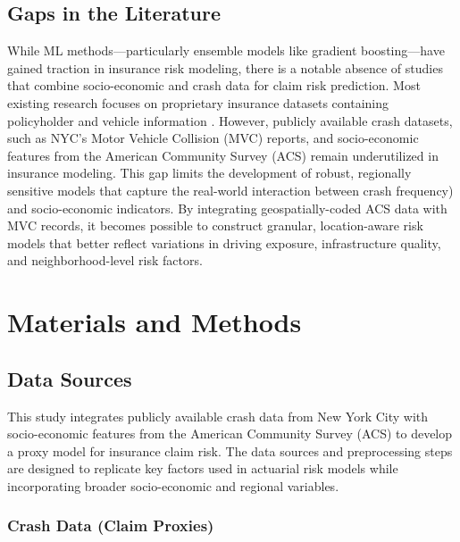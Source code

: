 \documentclass[
  number,
  review,
  3p]{elsarticle}
\begin{document}
\subsection{\texorpdfstring{\textbf{Gaps in the
Literature}}{Gaps in the Literature}}\label{gaps-in-the-literature}

While ML methods---particularly ensemble models like gradient
boosting---have gained traction in insurance risk modeling, there is a
notable absence of studies that combine socio-economic and crash data
for claim risk prediction. Most existing research focuses on proprietary
insurance datasets containing policyholder and vehicle information
\citep{clemente, henckaerts, jonkheijm}. However, publicly available
crash datasets, such as NYC's Motor Vehicle Collision (MVC) reports, and
socio-economic features from the American Community Survey (ACS) remain
underutilized in insurance modeling. This gap limits the development of
robust, regionally sensitive models that capture the real-world
interaction between crash frequency) and socio-economic indicators. By
integrating geospatially-coded ACS data with MVC records, it becomes
possible to construct granular, location-aware risk models that better
reflect variations in driving exposure, infrastructure quality, and
neighborhood-level risk factors.

\section{Materials and Methods}\label{materials-and-methods}

\subsection{\texorpdfstring{\textbf{Data
Sources}}{Data Sources}}\label{data-sources}

This study integrates publicly available crash data from New York City
with socio-economic features from the American Community Survey (ACS) to
develop a proxy model for insurance claim risk. The data sources and
preprocessing steps are designed to replicate key factors used in
actuarial risk models while incorporating broader socio-economic and
regional variables.

\subsubsection{\texorpdfstring{\textbf{Crash Data (Claim
Proxies)}}{Crash Data (Claim Proxies)}}\label{crash-data-claim-proxies}
\end{document}
